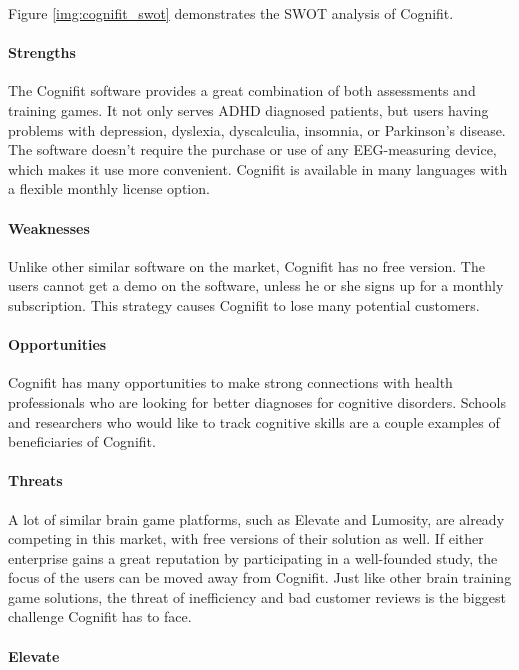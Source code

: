 \documentclass[letterpaper,10pt]{article}
\begin{document}
Figure \ref{img:cognifit_swot} demonstrates the SWOT analysis of Cognifit.

\paragraph{Strengths}

The Cognifit software provides a great combination of both assessments and training games. It not only serves ADHD diagnosed patients, but users having problems with depression, dyslexia, dyscalculia, insomnia, or Parkinson's disease. The software doesn't require the purchase or use of any EEG-measuring device, which makes it use more convenient. Cognifit is available in many languages with a flexible monthly license option.

\paragraph{Weaknesses}

Unlike other similar software on the market, Cognifit has no free version. The users cannot get a demo on the software, unless he or she signs up for a monthly subscription. This strategy causes Cognifit to lose many potential customers. 

\paragraph{Opportunities}

Cognifit has many opportunities to make strong connections with health professionals who are looking for better diagnoses for cognitive disorders. Schools and researchers who would like to track cognitive skills are a couple examples of beneficiaries of Cognifit.


\paragraph{Threats}

A lot of similar brain game platforms, such as Elevate and Lumosity, are already competing in this market, with free versions of their solution as well. If either enterprise gains a great reputation by participating in a well-founded study, the focus of the users can be moved away from Cognifit.
Just like other brain training game solutions, the threat of inefficiency and bad customer reviews is the biggest challenge Cognifit has to face.

\paragraph{Elevate}
\end{document}
